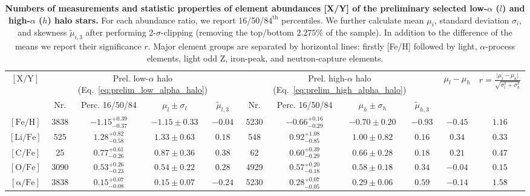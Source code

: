 \begingroup
\renewcommand{\arraystretch}{1.19}
\begin{table*}
\centering
\caption{\textbf{Numbers of measurements and statistic properties of element abundances [X/Y] of the preliminary selected low-$\alpha$ ($l$) and high-$\alpha$ ($h$) halo stars.} For each abundance ratio, we report 16/50/$84^\text{th}$ percentiles. We further calculate mean $\mu_i$, standard deviation $\sigma_i$, and skewness $\tilde{\mu}_{i,3}$ after performing 2-$\sigma$-clipping (removing the top/bottom $2.275\%$ of the sample). In addition to the difference of the means we report their significance $r$. Major element groups are separated by horizontal lines: firstly [Fe/H] followed by light, $\alpha$-process elements, light odd Z, iron-peak, and neutron-capture elements.  }
\label{tab:xfe_percentiles}
\begin{tabular}{c|cccc|cccc|cc}
\hline \hline
\multirow{2}{*}{$\mathrm{[X/Y]}$} & \multicolumn{4}{c}{Prel. low-$\alpha$ halo (Eq.~\protect\ref{eq:prelim_low_alpha_halo})} & \multicolumn{4}{c}{Prel. high-$\alpha$ halo (Eq.~\protect\ref{eq:prelim_high_alpha_halo})} & \multirow{2}{*}{$\mu_l - \mu_h$} & \multirow{2}{*}{$r = \frac{\vert \mu_l - \mu_h \vert}{\sqrt{\sigma_l^2 + \sigma_h^2}}$}\\
 & Nr. & Perc. 16/50/84 & $\mu_l \pm \sigma_l$ & $\tilde{\mu}_{l,3}$ & Nr. & Perc. 16/50/84 & $\mu_h \pm \sigma_h$ & $\tilde{\mu}_{h,3}$ & &  \\
\hline
$\mathrm{[Fe/H]}$ & 3838 & $-1.15_{-0.37}^{+0.39}$ & $-1.15 \pm 0.33$ & $-0.04$ & 5230 & $-0.66_{-0.29}^{+0.16}$ & $-0.70 \pm 0.20$ & $-0.93$ & $-0.45$ & $1.16$  \\
\hline
$\mathrm{[Li/Fe]}$ & 525 & $1.28_{-0.58}^{+0.82}$ & $1.33 \pm 0.63$ & $0.18$ & 548 & $0.92_{-0.85}^{+1.08}$ & $1.00 \pm 0.82$ & $0.16$ & $0.34$ & $0.33$  \\
$\mathrm{[C/Fe]}$ & 25 & $0.77_{-0.26}^{+0.61}$ & $0.87 \pm 0.36$ & $0.38$ & 62 & $0.60_{-0.29}^{+0.39}$ & $0.66 \pm 0.28$ & $0.18$ & $0.21$ & $0.47$  \\
$\mathrm{[O/Fe]}$ & 3090 & $0.53_{-0.23}^{+0.26}$ & $0.54 \pm 0.22$ & $0.28$ & 4929 & $0.57_{-0.18}^{+0.20}$ & $0.58 \pm 0.18$ & $0.34$ & $-0.04$ & $0.15$  \\
\hline
$\mathrm{[\alpha/Fe]}$ & 3838 & $0.15_{-0.08}^{+0.07}$ & $0.15 \pm 0.07$ & $-0.24$ & 5230 & $0.28_{-0.05}^{+0.07}$ & $0.29 \pm 0.06$ & $0.59$ & $-0.14$ & $1.58$  \\

\end{tabular}
\end{table*}
